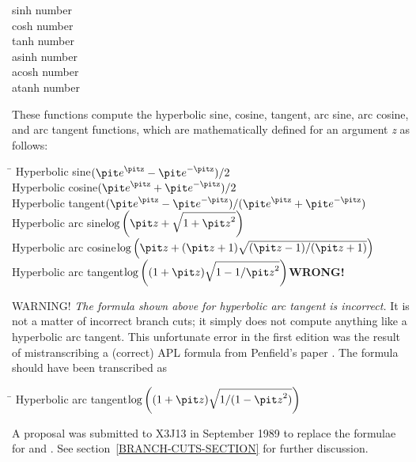\begin{defun}[Function]
sinh number \\
cosh number \\
tanh number \\
asinh number \\
acosh number \\
atanh number

\begin{obsolete}\noindent
These functions compute the hyperbolic sine, cosine, tangent,
arc sine, arc cosine, and arc tangent functions, which are mathematically
defined for an argument {\it z} as follows:

\begin{tabbing}
\hskip 10pc\=\kill
Hyperbolic sine\>$ ({\it e}^{\hbox{\scriptsize\it z}}-{\it e}^{-\hbox{\scriptsize\it z}})/2 $ \\
Hyperbolic cosine\>$ ({\it e}^{\hbox{\scriptsize\it z}}+{\it e}^{-\hbox{\scriptsize\it z}})/2 $ \\
Hyperbolic tangent\>$ ({\it e}^{\hbox{\scriptsize\it z}}-{\it e}^{-\hbox{\scriptsize\it z}})/({\it e}^{\hbox{\scriptsize\it z}}+{\it e}^{-\hbox{\scriptsize\it z}}) $ \\[2pt]
Hyperbolic arc sine\>$ \log \left({\it z}+\sqrt{1+{\it z}^2}\right) $ \\[2pt]
Hyperbolic arc cosine\>$ \log \left({\it z}+({\it z}+1)\sqrt{({\it z}-1)/({\it z}+1)}\right) $ \\[2pt]
Hyperbolic arc tangent\>$ \log \left((1+{\it z})\sqrt{1-1/{\it z}^2}\right) $\`{\bf WRONG!}
\end{tabbing}
\end{obsolete}

\begin{newer}
WARNING!  {\it The formula shown above for hyperbolic arc tangent is incorrect.}
It is not a matter of incorrect branch cuts; it simply does not compute anything
like a hyperbolic arc tangent.  This unfortunate error in the first edition
was the result of mistranscribing a (correct) APL formula from Penfield's paper
\cite{APL-BRANCH-CUTS}.  The formula should have been transcribed as
\begin{tabbing}
\hskip 10pc\=\kill
Hyperbolic arc tangent\>$ \log \left((1+{\it z})\sqrt{1/(1-{\it z}^2)}\right) $
\end{tabbing}
A proposal was submitted to X3J13 in September 1989 to replace the
formulae for  and .
See section~\ref{BRANCH-CUTS-SECTION} for further discussion.
\end{newer}


\end{defun}
